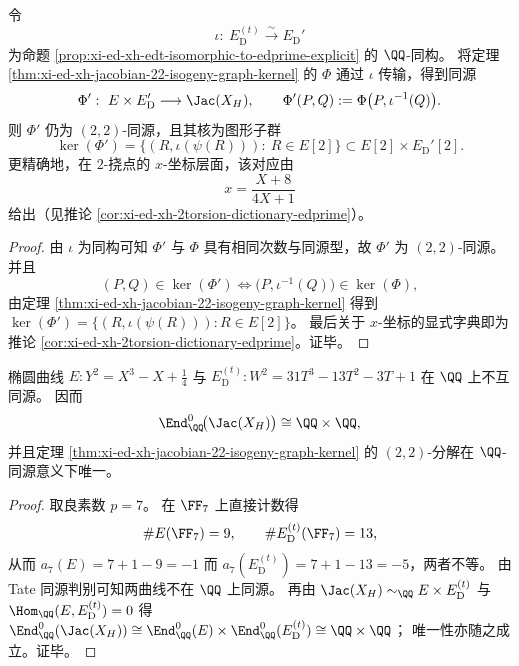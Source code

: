 \begin{corollary}\label{cor:xi-ed-xh-jacobian-22-isogeny-edprime-kernel}
令
\[
\iota:\ E_{\mathrm D}^{(t)}\xrightarrow{\ \sim\ }E_{\mathrm D}'
\]
为命题 \ref{prop:xi-ed-xh-edt-isomorphic-to-edprime-explicit} 的 \(\QQ\)-同构。
将定理 \ref{thm:xi-ed-xh-jacobian-22-isogeny-graph-kernel} 的 \(\Phi\) 通过 \(\iota\) 传输，得到同源
\[
\Phi':\ E\times E_{\mathrm D}'\longrightarrow \Jac(X_H),
\qquad
\Phi'(P,Q):=\Phi\bigl(P,\iota^{-1}(Q)\bigr).
\]
则 \(\Phi'\) 仍为 \((2,2)\)-同源，且其核为图形子群
\[
\ker(\Phi')=\{(R,\iota(\psi(R))):\ R\in E[2]\}\subset E[2]\times E_{\mathrm D}'[2].
\]
更精确地，在 \(2\)-挠点的 \(x\)-坐标层面，该对应由
\[
x=\frac{X+8}{4X+1}
\]
给出（见推论 \ref{cor:xi-ed-xh-2torsion-dictionary-edprime}）。
\end{corollary}
\begin{proof}
由 \(\iota\) 为同构可知 \(\Phi'\) 与 \(\Phi\) 具有相同次数与同源型，故 \(\Phi'\) 为 \((2,2)\)-同源。
并且
\[
(P,Q)\in \ker(\Phi')
\iff
\bigl(P,\iota^{-1}(Q)\bigr)\in \ker(\Phi),
\]
由定理 \ref{thm:xi-ed-xh-jacobian-22-isogeny-graph-kernel} 得到
\(
\ker(\Phi')=\{(R,\iota(\psi(R))):R\in E[2]\}
\)。
最后关于 \(x\)-坐标的显式字典即为推论 \ref{cor:xi-ed-xh-2torsion-dictionary-edprime}。证毕。
\end{proof}

\begin{proposition}\label{prop:xi-ed-xh-nonisogenous-and-endomorphism-rigidity}
椭圆曲线 \(E: Y^2=X^3-X+\tfrac14\) 与 \(E_{\mathrm D}^{(t)}:W^2=31T^3-13T^2-3T+1\) 在 \(\QQ\) 上不互同源。
因而
\[
\End^0_{\QQ}\!\bigl(\Jac(X_H)\bigr)\cong \QQ\times\QQ,
\]
并且定理 \ref{thm:xi-ed-xh-jacobian-22-isogeny-graph-kernel} 的 \((2,2)\)-分解在 \(\QQ\)-同源意义下唯一。
\end{proposition}
\begin{proof}
取良素数 \(p=7\)。
在 \(\FF_7\) 上直接计数得
\[
\#E(\FF_7)=9,\qquad \#E_{\mathrm D}^{(t)}(\FF_7)=13,
\]
从而
\(
a_7(E)=7+1-9=-1
\)
而
\(
a_7(E_{\mathrm D}^{(t)})=7+1-13=-5
\)，两者不等。
由 Tate 同源判别可知两曲线不在 \(\QQ\) 上同源。
再由 \(\Jac(X_H)\sim_{\QQ}E\times E_{\mathrm D}^{(t)}\) 与 \(\Hom_{\QQ}(E,E_{\mathrm D}^{(t)})=0\) 得
\(
\End^0_{\QQ}(\Jac(X_H))\cong \End^0_{\QQ}(E)\times \End^0_{\QQ}(E_{\mathrm D}^{(t)})\cong \QQ\times\QQ
\)；
唯一性亦随之成立。证毕。
\end{proof}

